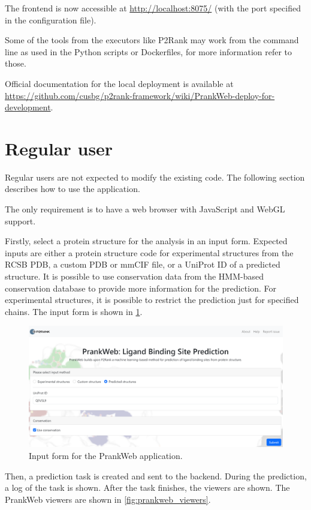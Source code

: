 The frontend is now accessible at \url{http://localhost:8075/} (with the port specified in the configuration file).

Some of the tools from the executors like P2Rank may work from the command line as used in the Python scripts or Dockerfiles, for more information refer to those.

Official documentation for the local deployment is available at \url{https://github.com/cusbg/p2rank-framework/wiki/PrankWeb-deploy-for-development}.


\section{Regular user}
\label{sec:regular_user}

Regular users are not expected to modify the existing code. The following section describes how to use the application.

The only requirement is to have a web browser with JavaScript and WebGL support.

Firstly, select a protein structure for the analysis in an input form. Expected inputs are either a protein structure code for experimental structures from the RCSB PDB, a custom PDB or mmCIF file, or a UniProt ID of a predicted structure. It is possible to use conservation data from the HMM-based conservation database to provide more information for the prediction. For experimental structures, it is possible to restrict the prediction just for specified chains. The input form is shown in \cref{fig:input_form}.

\begin{figure}[ht]
    \centering
    \includegraphics[width=\textwidth]{img/pw_introsite.png}
    \caption{Input form for the PrankWeb application.}
    \label{fig:input_form}
\end{figure}

Then, a prediction task is created and sent to the backend. During the prediction, a log of the task is shown. After the task finishes, the viewers are shown. The PrankWeb viewers are shown in \cref{fig:prankweb_viewers}.

